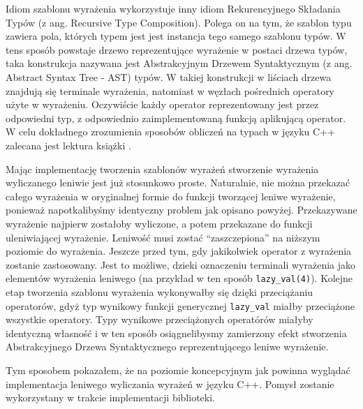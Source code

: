   
  Idiom szablonu wyrażenia wykorzystuje inny idiom Rekurencyjnego Składania Typów (z ang. Recursive Type Composition). 
  Polega on na tym, że szablon typu zawiera pola, których typem jest jest instancja tego samego szablonu typów.
  W tens sposób powstaje drzewo reprezentujące wyrażenie w postaci drzewa typów, taka konstrukcja nazywana jest Abstrakcyjnym Drzewem Syntaktycznym (z ang. Abstract Syntax Tree - AST) typów.
  W takiej konstrukcji w liściach drzewa znajdują się terminale wyrażenia, natomiast w węzłach pośrednich operatory użyte w wyrażeniu.
  Oczywiście każdy operator reprezentowany jest przez odpowiedni typ, z odpowiednio zaimplementowaną funkcją aplikującą operator.
  W celu dokładnego zrozumienia sposobów obliczeń na typach w języku C++ zalecana jest lektura książki \cite{temguide}.
  
  
  Mając implementację tworzenia szablonów wyrażeń stworzenie wyrażenia wyliczanego leniwie jest już stosunkowo proste.
  Naturalnie, nie można przekazać całego wyrażenia w oryginalnej formie do funkcji tworzącej leniwe wyrażenie, ponieważ napotkalibyśmy identyczny problem jak opisano powyżej.
  Przekazywane wyrażenie najpierw zostałoby wyliczone, a potem przekazane do funkcji uleniwiającej wyrażenie.
  Leniwość musi zostać ``zaszczepiona'' na niższym poziomie do wyrażenia. Jeszcze przed tym, gdy jakikolwiek operator z wyrażenia zostanie zastosowany.
  Jest to możliwe, dzieki oznaczeniu terminali wyrażenia jako elementów wyrażenia leniwego (na przykład w ten sposób \verb|lazy_val(4)|).
  Kolejne etap tworzenia szablonu wyrażenia wykonywałby się dzięki przeciążaniu operatorów, gdyż typ wynikowy funkcji generycznej \verb|lazy_val| miałby przeciążone wszystkie operatory.
  Typy wynikowe przeciążonych operatórów miałyby identyczną własność i w ten sposób osiągnelibysmy zamierzony efekt stworzenia Abstrakcyjnego Drzewa Syntaktycznego reprezentującego leniwe wyrażenie.
  
  Tym sposobem pokazałem, że na poziomie koncepcyjnym jak powinna wyglądać implementacja leniwego wyliczania wyrażeń w języku C++.
  Pomysł zostanie wykorzystany w trakcie implementacji biblioteki.
  

